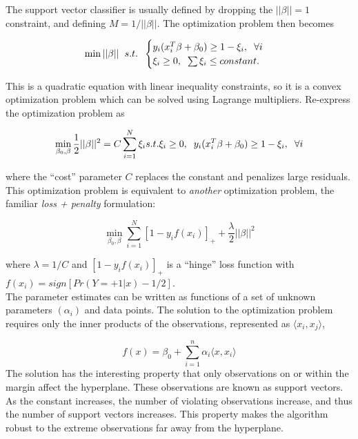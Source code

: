 \documentclass[
]{book}
\begin{document}
The support vector classifier is usually defined by dropping the \(||\beta|| = 1\) constraint, and defining \(M = 1 / ||\beta||\). The optimization problem then becomes

\[
 \min ||\beta|| \hspace{2mm} s.t. \hspace{2mm}  
  \begin{cases} 
   y_i(x_i^T\beta + \beta_0) \ge 1 - \xi_i, \hspace{2mm} \forall i &  \\
   \xi_i \ge 0, \hspace{2mm} \sum \xi_i \le constant.      
  \end{cases}
\]

This is a quadratic equation with linear inequality constraints, so it is a convex optimization problem which can be solved using Lagrange multipliers. Re-express the optimization problem as

\[
\min_{\beta_0, \beta} \frac{1}{2}||\beta||^2 = C\sum_{i = 1}^N \xi_i \\
s.t. \xi_i \ge 0, \hspace{2mm} y_i(x_i^T\beta + \beta_0) \ge 1 - \xi_i, \hspace{2mm} \forall i
\]

where the ``cost'' parameter \(C\) replaces the constant and penalizes large residuals. This optimization problem is equivalent to \emph{another} optimization problem, the familiar \emph{loss + penalty} formulation:

\[\min_{\beta_0, \beta} \sum_{i=1}^N{[1 - y_if(x_i)]_+} + \frac{\lambda}{2} ||\beta||^2 \]

where \(\lambda = 1 / C\) and \([1 - y_if(x_i)]_+\) is a ``hinge'' loss function with \(f(x_i) = sign[Pr(Y = +1|x) - 1 / 2]\).\\
The parameter estimates can be written as functions of a set of unknown parameters \((\alpha_i)\) and data points. The solution to the optimization problem requires only the inner products of the observations, represented as \(\langle x_i, x_j \rangle\),

\[f(x) = \beta_0 + \sum_{i = 1}^n {\alpha_i \langle x, x_i \rangle}\]
The solution has the interesting property that only observations on or within the margin affect the hyperplane. These observations are known as support vectors. As the constant increases, the number of violating observations increase, and thus the number of support vectors increases. This property makes the algorithm robust to the extreme observations far away from the hyperplane.
\end{document}
